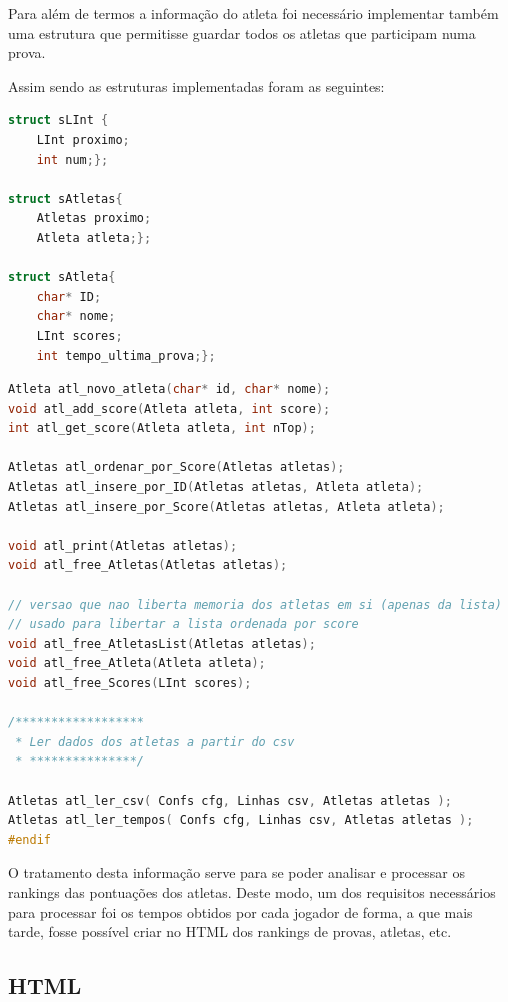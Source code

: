 \documentclass[11pt, a4paper, oneside]{article}
\begin{document}
Para além de termos a informação do atleta foi necessário implementar também uma estrutura que permitisse guardar todos os atletas que participam numa prova.

Assim sendo as estruturas implementadas foram as seguintes:

\begin{lstlisting}[language=C, caption={Estrutura de um atleta.}]
struct sLInt {
    LInt proximo;
    int num;};

struct sAtletas{
    Atletas proximo;
    Atleta atleta;};

struct sAtleta{
    char* ID;
    char* nome;
    LInt scores;
    int tempo_ultima_prova;};
\end{lstlisting}

\begin{lstlisting}[language=C, caption={Assinatura das funções.}]
Atleta atl_novo_atleta(char* id, char* nome);
void atl_add_score(Atleta atleta, int score);
int atl_get_score(Atleta atleta, int nTop);

Atletas atl_ordenar_por_Score(Atletas atletas);
Atletas atl_insere_por_ID(Atletas atletas, Atleta atleta);
Atletas atl_insere_por_Score(Atletas atletas, Atleta atleta);

void atl_print(Atletas atletas);
void atl_free_Atletas(Atletas atletas);

// versao que nao liberta memoria dos atletas em si (apenas da lista)
// usado para libertar a lista ordenada por score
void atl_free_AtletasList(Atletas atletas);
void atl_free_Atleta(Atleta atleta);
void atl_free_Scores(LInt scores);

/******************
 * Ler dados dos atletas a partir do csv
 * ***************/

Atletas atl_ler_csv( Confs cfg, Linhas csv, Atletas atletas );
Atletas atl_ler_tempos( Confs cfg, Linhas csv, Atletas atletas );
#endif
\end{lstlisting}

O tratamento desta informação serve para se poder analisar e processar os rankings das pontuações dos atletas. Deste modo, um dos requisitos necessários para processar foi os tempos obtidos por cada jogador de forma, a que mais tarde, fosse possível criar no HTML dos rankings de provas, atletas, etc.

\newpage
\subsection{HTML}
\end{document}
